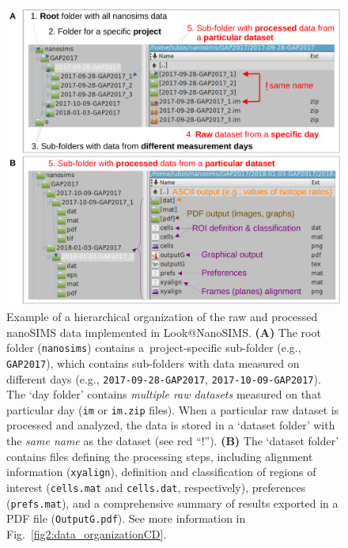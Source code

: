 \documentclass[a4paper, 11pt]{article}
\newcommand{\ttt}[1]{\texttt{#1}}
\newcounter{step}
\begin{document}
\begin{figure}[ht]
\centering
\includegraphics[width=\textwidth]{figs2/folders_organizationAB}
\caption{\label{fig2:data_organizationAB}%
	Example of a hierarchical organization of the raw and processed nanoSIMS data implemented in Look@NanoSIMS. %
  \textbf{(A)} The root folder (\ttt{nanosims}) contains a~project-specific sub-folder (e.g., \ttt{GAP2017}), which contains sub-folders with data measured on different days (e.g., \ttt{2017-09-28-GAP2017}, \ttt{2017-10-09-GAP2017}). %
  The `day folder' contains \emph{multiple raw datasets} measured on that particular day (\ttt{im} or \ttt{im.zip} files). %
  When a particular raw dataset is processed and analyzed, the data is stored in a `dataset folder' with the \emph{same name} as the dataset (see red ``!''). %
  \textbf{(B)} The `dataset folder' contains files defining the processing steps, including alignment information (\ttt{xyalign}), definition and classification of regions of interest (\ttt{cells.mat} and \ttt{cells.dat}, respectively), preferences (\ttt{prefs.mat}), and a comprehensive summary of results exported in a PDF file (\ttt{OutputG.pdf}). %
  See more information in Fig.~\ref{fig2:data_organizationCD}.%
}
\end{figure}
\end{document}
